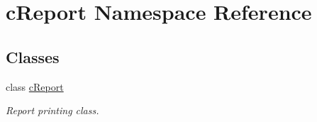 \hypertarget{namespacecReport}{\section{c\-Report \-Namespace \-Reference}
\label{namespacecReport}
}
\subsection*{\-Classes}
\begin{DoxyCompactItemize}
\item 
class \hyperlink{classcReport_1_1cReport}{c\-Report}
\begin{DoxyCompactList}\small\item\em \-Report printing class. \end{DoxyCompactList}\end{DoxyCompactItemize}
